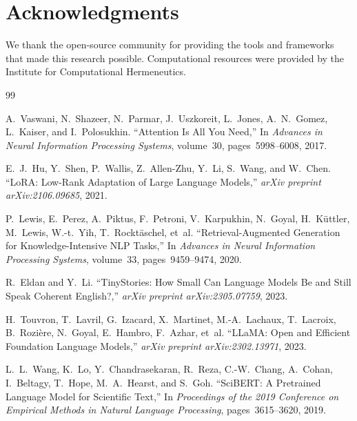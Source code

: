 \documentclass[11pt,a4paper,twocolumn]{article}
\theoremstyle{plain}
\theoremstyle{definition}
\begin{document}
\section*{Acknowledgments}
We thank the open-source community for providing the tools and 
frameworks that made this research possible. Computational 
resources were provided by the Institute for Computational 
Hermeneutics.


\begin{thebibliography}{99}

A.~Vaswani, N.~Shazeer, N.~Parmar, J.~Uszkoreit, L.~Jones, A.~N.~Gomez, 
\newblock L.~Kaiser, and I.~Polosukhin.
\newblock ``Attention Is All You Need,''
\newblock In \textit{Advances in Neural Information Processing Systems}, 
\newblock volume~30, pages~5998--6008, 2017.

E.~J.~Hu, Y.~Shen, P.~Wallis, Z.~Allen-Zhu, Y.~Li, S.~Wang, and W.~Chen.
\newblock ``LoRA: Low-Rank Adaptation of Large Language Models,''
\newblock \textit{arXiv preprint arXiv:2106.09685}, 2021.

P.~Lewis, E.~Perez, A.~Piktus, F.~Petroni, V.~Karpukhin, N.~Goyal, 
\newblock H.~K{\"u}ttler, M.~Lewis, W.-t.~Yih, T.~Rockt{\"a}schel, et~al.
\newblock ``Retrieval-Augmented Generation for Knowledge-Intensive NLP Tasks,''
\newblock In \textit{Advances in Neural Information Processing Systems}, 
\newblock volume~33, pages~9459--9474, 2020.

R.~Eldan and Y.~Li.
\newblock ``TinyStories: How Small Can Language Models Be and Still Speak 
\newblock Coherent English?,''
\newblock \textit{arXiv preprint arXiv:2305.07759}, 2023.

H.~Touvron, T.~Lavril, G.~Izacard, X.~Martinet, M.-A.~Lachaux, 
\newblock T.~Lacroix, B.~Rozi{\`e}re, N.~Goyal, E.~Hambro, F.~Azhar, et~al.
\newblock ``LLaMA: Open and Efficient Foundation Language Models,''
\newblock \textit{arXiv preprint arXiv:2302.13971}, 2023.

L.~L.~Wang, K.~Lo, Y.~Chandrasekaran, R.~Reza, C.-W.~Chang, A.~Cohan, 
\newblock I.~Beltagy, T.~Hope, M.~A.~Hearst, and S.~Goh.
\newblock ``SciBERT: A Pretrained Language Model for Scientific Text,''
\newblock In \textit{Proceedings of the 2019 Conference on Empirical Methods 
\newblock in Natural Language Processing}, pages~3615--3620, 2019.


\end{thebibliography}
\end{document}
